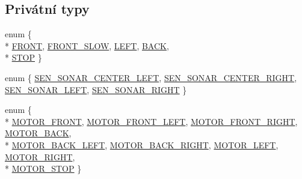 \subsection*{Privátní typy}
\begin{DoxyCompactItemize}
\item 
enum \{ \\*
\hyperlink{class_sekacka_a4b9f99f468351377c74f1906012dddcead823d74f46614cb9d4c6256a47d52427}{F\+R\+O\+NT}, 
\hyperlink{class_sekacka_a4b9f99f468351377c74f1906012dddcea48ecf5835232244136c4f81df5843716}{F\+R\+O\+N\+T\+\_\+\+S\+L\+OW}, 
\hyperlink{class_sekacka_a4b9f99f468351377c74f1906012dddcea84850430a560bac207f0c6c43e5f6db3}{L\+E\+FT}, 
\hyperlink{class_sekacka_a4b9f99f468351377c74f1906012dddcea1e7fc60b9bccf54cce66fb95ce4381af}{B\+A\+CK}, 
\\*
\hyperlink{class_sekacka_a4b9f99f468351377c74f1906012dddcea78fa66f2894ab0692bd2da0aafd67ffd}{S\+T\+OP}
 \}
\item 
enum \{ \hyperlink{class_sekacka_aedeaa9da2c7ac3e0e3c4428aa4900e51a379a7e5f78b78b7648cae76ae7fbc68b}{S\+E\+N\+\_\+\+S\+O\+N\+A\+R\+\_\+\+C\+E\+N\+T\+E\+R\+\_\+\+L\+E\+FT}, 
\hyperlink{class_sekacka_aedeaa9da2c7ac3e0e3c4428aa4900e51adcf2288828acde8c4d12bf4822649b1d}{S\+E\+N\+\_\+\+S\+O\+N\+A\+R\+\_\+\+C\+E\+N\+T\+E\+R\+\_\+\+R\+I\+G\+HT}, 
\hyperlink{class_sekacka_aedeaa9da2c7ac3e0e3c4428aa4900e51afdaf5f1fef5da7d907721e6ecf8fa8cd}{S\+E\+N\+\_\+\+S\+O\+N\+A\+R\+\_\+\+L\+E\+FT}, 
\hyperlink{class_sekacka_aedeaa9da2c7ac3e0e3c4428aa4900e51aa4b8410a39bc42c19d5a57e269e3dc10}{S\+E\+N\+\_\+\+S\+O\+N\+A\+R\+\_\+\+R\+I\+G\+HT}
 \}
\item 
enum \{ \\*
\hyperlink{class_sekacka_a0edd5506d9ddcf2b4b243c985ecd5160a0cd5677d8ceffda417bcc18a781017b9}{M\+O\+T\+O\+R\+\_\+\+F\+R\+O\+NT}, 
\hyperlink{class_sekacka_a0edd5506d9ddcf2b4b243c985ecd5160a55b8b97cf76f21d488480a8eb873d200}{M\+O\+T\+O\+R\+\_\+\+F\+R\+O\+N\+T\+\_\+\+L\+E\+FT}, 
\hyperlink{class_sekacka_a0edd5506d9ddcf2b4b243c985ecd5160ac7548fd36c3ebc4fc29d3d7023880fab}{M\+O\+T\+O\+R\+\_\+\+F\+R\+O\+N\+T\+\_\+\+R\+I\+G\+HT}, 
\hyperlink{class_sekacka_a0edd5506d9ddcf2b4b243c985ecd5160a9e179057564e6515f78816d495ff0d0f}{M\+O\+T\+O\+R\+\_\+\+B\+A\+CK}, 
\\*
\hyperlink{class_sekacka_a0edd5506d9ddcf2b4b243c985ecd5160a0902d9742484c9c9e0a6eb5da8229eba}{M\+O\+T\+O\+R\+\_\+\+B\+A\+C\+K\+\_\+\+L\+E\+FT}, 
\hyperlink{class_sekacka_a0edd5506d9ddcf2b4b243c985ecd5160a110449350235a35afc101260af71b906}{M\+O\+T\+O\+R\+\_\+\+B\+A\+C\+K\+\_\+\+R\+I\+G\+HT}, 
\hyperlink{class_sekacka_a0edd5506d9ddcf2b4b243c985ecd5160a5b08a4031a954a7753fd8d81481fcd6c}{M\+O\+T\+O\+R\+\_\+\+L\+E\+FT}, 
\hyperlink{class_sekacka_a0edd5506d9ddcf2b4b243c985ecd5160a19115f90a2b8cb651933bc44ce9f1af2}{M\+O\+T\+O\+R\+\_\+\+R\+I\+G\+HT}, 
\\*
\hyperlink{class_sekacka_a0edd5506d9ddcf2b4b243c985ecd5160a507ecdc492d55c96b8e4bae21d49a360}{M\+O\+T\+O\+R\+\_\+\+S\+T\+OP}
 \}
\end{DoxyCompactItemize}
